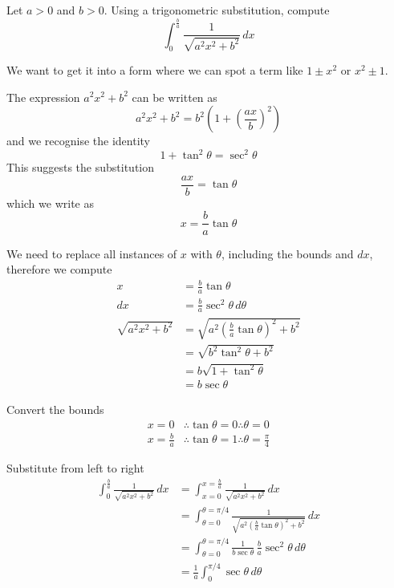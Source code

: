 \begin{example}
    Let $a>0$ and $b>0$. Using a trigonometric substitution, compute
    \[
        \int_{0}^{\frac{b}{a}}\frac{1}{\sqrt{a^2x^2+b^2}}\,dx
    \]
\end{example}

\begin{solution}

    We want to get it into a form where we can spot a term like $1 \pm x^2$ or $x^2 \pm 1$.
    

    The expression $a^2x^2+b^2$ can be written as
    \[
        a^2x^2+b^2=b^2\left(1+\left(\frac{ax}{b}\right)^2\right)
    \]
    and we recognise the identity
    \[
        1+\tan^2\theta=\sec^2\theta
    \]
    This suggests the substitution
    \[
        \frac{ax}{b}=\tan\theta
    \]
    which we write as
    \[
        x=\frac{b}{a}\tan\theta
    \]

    We need to replace all instances of $x$ with $\theta$, including the bounds and $dx$, therefore we compute
    \begin{align*}
        x &= \frac{b}{a}\tan\theta\\
        dx &= \frac{b}{a}\sec^2\theta\,d\theta\\
        \sqrt{a^2x^2+b^2}
        &= \sqrt{a^2\left(\frac{b}{a}\tan\theta\right)^2+b^2}\\
        &= \sqrt{b^2\tan^2\theta+b^2}\\
        &= b\sqrt{1+\tan^2\theta}\\
        &= b\sec\theta
    \end{align*}

    Convert the bounds
    \begin{align*}
        x=0 &\therefore \tan\theta=0 \therefore \theta=0\\
        x=\frac{b}{a} &\therefore \tan\theta=1 \therefore \theta=\frac{\pi}{4}
    \end{align*}

    Substitute from left to right
    \begin{align*}
        \int_{0}^{\frac{b}{a}}\frac{1}{\sqrt{a^2x^2+b^2}}\,dx
        &= \int_{x=0}^{x=\frac{b}{a}}\frac{1}{\sqrt{a^2x^2+b^2}}\,dx\\
        &= \int_{\theta=0}^{\theta=\pi/4}\frac{1}{\sqrt{a^2\left(\frac{b}{a}\tan\theta\right)^2+b^2}}\,dx\\
        &= \int_{\theta=0}^{\theta=\pi/4}\frac{1}{b\sec\theta}\,\frac{b}{a}\sec^2\theta\,d\theta\\
        &= \frac{1}{a}\int_{0}^{\pi/4}\sec\theta\,d\theta
    \end{align*}


\end{solution}
